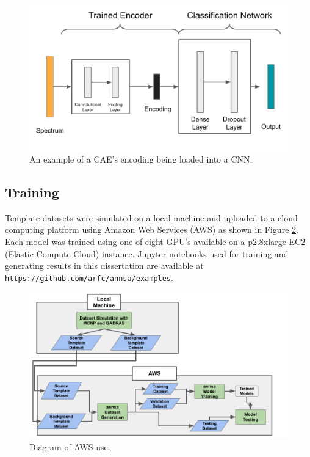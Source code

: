 \begin{figure}[H]
\centering
\includegraphics[trim=0 0 0 0,clip,width=0.9\linewidth]{images/annsa_caednn.png}
\caption{An example of a CAE's encoding being loaded into a CNN.}
\label{fig:annsa_caednn}
\end{figure}


\subsection{Training}

Template datasets were simulated on a local machine and uploaded to a cloud computing platform using Amazon Web Services (AWS) as shown in Figure \ref{fig:local_cloud_diagram}. Each model was trained using one of eight GPU's available on a p2.8xlarge EC2 (Elastic Compute Cloud) instance. Jupyter notebooks used for training and generating results in this dissertation are available at \verb|https://github.com/arfc/annsa/examples|.

\begin{figure}[H]
	\centering
	\includegraphics[trim=0 0 20 0,clip,width=1.0\linewidth]{images/local_cloud_diagram.png}
	\caption{Diagram of AWS use.}
	\label{fig:local_cloud_diagram}
\end{figure}




